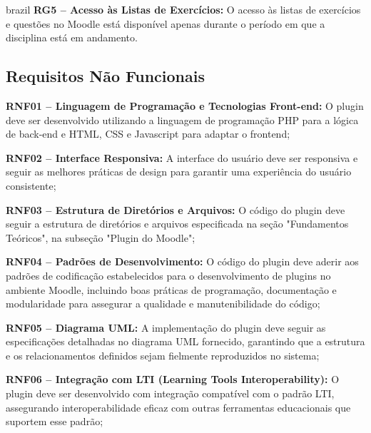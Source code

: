 \begin{otherlanguage*}{brazil}
    \textbf{RG5 – Acesso às Listas de Exercícios:} O acesso às listas de exercícios e questões no Moodle está disponível apenas durante o período em que a disciplina está em andamento.

    \vspace{12pt}

    \subsection{Requisitos Não Funcionais}

    \textbf{RNF01 – Linguagem de Programação e Tecnologias Front-end:} O plugin deve ser desenvolvido utilizando a linguagem de programação PHP para a lógica de back-end e HTML, CSS e Javascript para adaptar o frontend;

    \vspace{12pt}

    \textbf{RNF02 – Interface Responsiva:} A interface do usuário deve ser responsiva e seguir as melhores práticas de design para garantir uma experiência do usuário consistente;

    \vspace{12pt}

    \textbf{RNF03 – Estrutura de Diretórios e Arquivos:} O código do plugin deve seguir a estrutura de diretórios e arquivos especificada na seção "Fundamentos Teóricos", na subseção "Plugin do Moodle";

    \vspace{12pt}

    \textbf{RNF04 – Padrões de Desenvolvimento:} O código do plugin deve aderir aos padrões de codificação estabelecidos para o desenvolvimento de plugins no ambiente Moodle, incluindo boas práticas de programação, documentação e modularidade para assegurar a qualidade e manutenibilidade do código;

    \vspace{12pt}

    \textbf{RNF05 – Diagrama UML:} A implementação do plugin deve seguir as especificações detalhadas no diagrama UML fornecido, garantindo que a estrutura e os relacionamentos definidos sejam fielmente reproduzidos no sistema;

    \vspace{12pt}

    \textbf{RNF06 – Integração com LTI (Learning Tools Interoperability):} O plugin deve ser desenvolvido com integração compatível com o padrão LTI, assegurando interoperabilidade eficaz com outras ferramentas educacionais que suportem esse padrão;


\end{otherlanguage*}
